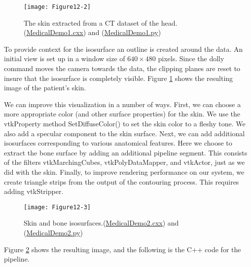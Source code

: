 \begin{figure}[!htb]
	\centering
	\texttt{[image: Figure12-2]}
	\caption{The skin extracted from a CT dataset of the head.(\href{https://lorensen.github.io/VTKExamples/site/Cxx/Medical/MedicalDemo1/}{MedicalDemo1.cxx}) and (\href{https://lorensen.github.io/VTKExamples/site/Python/Medical/MedicalDemo1/}{MedicalDemo1.py})}
	\label{fig:Figure12-2}
\end{figure}

To provide context for the isosurface an outline is created around the data. An initial view is set up  in a window size of $640 \times 480$ pixels. Since the dolly command moves the camera towards the data, the clipping planes are reset to insure that the isosurface is
completely visible. Figure \ref{fig:Figure12-2} shows the resulting image of the patient's skin.

We can improve this visualization in a number of ways. First, we can choose a more appropriate color (and other surface properties) for the skin. We use the vtkProperty method SetDiffuseColor() to set the skin color to a fleshy tone. We also add a specular component to the skin surface. Next, we can add additional isosurfaces corresponding to various anatomical features. Here we choose to extract the bone surface by adding an additional pipeline segment. This consists of the filters vtkMarchingCubes, vtkPolyDataMapper, and vtkActor, just as we did with the skin. Finally, to improve rendering performance on our system, we create triangle strips from the output of the contouring process. This requires adding vtkStripper.

\begin{figure}[!htb]
	\centering
	\texttt{[image: Figure12-3]}
	\caption{Skin and bone isosurfaces.(\href{https://lorensen.github.io/VTKExamples/site/Cxx/Medical/MedicalDemo2/}{MedicalDemo2.cxx}) and (\href{https://lorensen.github.io/VTKExamples/site/Python/Medical/MedicalDemo2/}{MedicalDemo2.py})}
	\label{fig:Figure12-3}
\end{figure}

Figure \ref{fig:Figure12-3} shows the resulting image, and the following is the C++ code for the pipeline.


